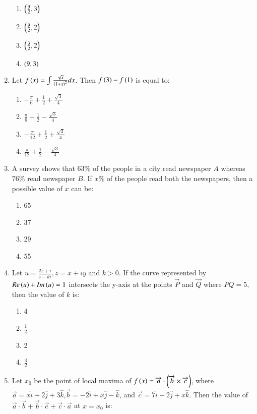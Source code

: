 \documentclass[journal]{IEEEtran}
\begin{document}
\begin{enumerate}
\begin{enumerate}
    \item $\left(\frac{9}{2},3\right)$
    \item $\left(\frac{9}{2},2\right)$
    \item $\left(\frac{3}{2},2\right)$
    \item $\left(9,3\right)$
\end{enumerate}
\item Let $f\left(x\right)=\int\frac{\sqrt{x}}{\left(1+x\right)^2} dx$. Then $f\left(3\right)-f\left(1\right)$ is equal to:
\begin{enumerate}
    \item $-\frac{\pi}{6}+\frac{1}{2}+\frac{\sqrt{3}}{4}$
    \item $\frac{\pi}{6}+\frac{1}{2}-\frac{\sqrt{3}}{4}$
    \item $-\frac{\pi}{12}+\frac{1}{2}+\frac{\sqrt{3}}{4}$
    \item $\frac{\pi}{12}+\frac{1}{2}-\frac{\sqrt{3}}{4}$
\end{enumerate}
\item A survey shows that $63\%$ of the people in a city read newspaper $ A$ whereas $76\%$ read newspaper $B$. If $x\%$ of the people read both the newspapers, then a possible value of $x$ can be:
\begin{enumerate}
\item 65 
\item 37
\item 29
\item 55
\end{enumerate}
\item Let $u=\frac{2z+i}{z-ki},z=x+iy$ and $k>0$. If the curve represented by $Re\left(u\right)+Im\left(u\right)=1$ intersects the y-axis at the points $\vec{P}$ and $\vec{Q}$ where $PQ=5$, then the value of $k$ is:
\begin{enumerate}
    \item 4
    \item $\frac{1}{2}$
    \item 2
    \item $\frac{3}{2}$
\end{enumerate}
\item Let $x_0$ be the point of local maxima of $f\left(x\right)=\overrightarrow{a}\cdot\left(\overrightarrow{b}\times \overrightarrow{c}\right)$, where $\overrightarrow{a}=x\hat{i}+2\hat{j}+3\hat{k}$,$\overrightarrow{b}=-2\hat{i}+x\hat{j}-\hat{k}$, and $\overrightarrow{c}=7\hat{i}-2\hat{j}+x\hat{k}$. Then the value of $ \overrightarrow{a}\cdot \overrightarrow{b}+\overrightarrow{b}\cdot \overrightarrow{c}+\overrightarrow{c}\cdot \overrightarrow{a}$ at $x=x_0$ is:

\end{enumerate}
\end{document}
